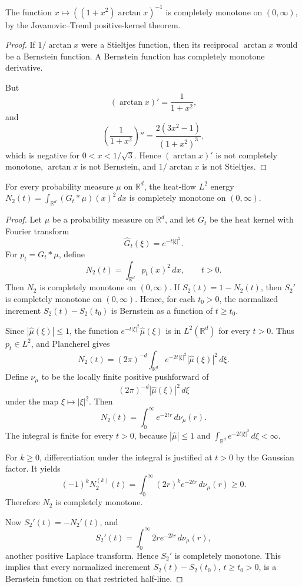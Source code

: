 \begin{lemma}
\label{res:jovanovic-treml-arctan-logderivative-cm}
The function \(x\mapsto ((1+x^2)\arctan x)^{-1}\) is completely monotone on \((0,\infty)\), by the Jovanovic--Treml positive-kernel theorem.
\end{lemma}
\begin{proof}
If \(1/\arctan x\) were a Stieltjes function, then its reciprocal \(\arctan x\) would be a Bernstein function. A Bernstein function has completely monotone derivative.

But
\[
(\arctan x)'=\frac1{1+x^2},
\]
and
\[
\left(\frac1{1+x^2}\right)''
=\frac{2(3x^2-1)}{(1+x^2)^3},
\]
which is negative for \(0<x<1/\sqrt3\). Hence \((\arctan x)'\) is not completely monotone, \(\arctan x\) is not Bernstein, and \(1/\arctan x\) is not Stieltjes.
\end{proof}

\begin{lemma}
\label{res:heat-flow-l2-energy-completely-monotone}
For every probability measure \(\mu\) on \(\mathbb R^d\), the heat-flow \(L^2\) energy \(N_2(t)=\int_{\mathbb R^d}(G_t*\mu)(x)^2\,dx\) is completely monotone on \((0,\infty)\).
\end{lemma}
\begin{proof}
Let \(\mu\) be a probability measure on \(\mathbb R^d\), and let \(G_t\) be the heat kernel with Fourier transform
\[
\widehat G_t(\xi)=e^{-t|\xi|^2}.
\]
For \(p_t=G_t*\mu\), define
\[
N_2(t)=\int_{\mathbb R^d}p_t(x)^2\,dx,\qquad t>0.
\]
Then \(N_2\) is completely monotone on \((0,\infty)\). If \(S_2(t)=1-N_2(t)\), then \(S_2'\) is completely monotone on \((0,\infty)\). Hence, for each \(t_0>0\), the normalized increment \(S_2(t)-S_2(t_0)\) is Bernstein as a function of \(t\ge t_0\).

Since \(|\widehat\mu(\xi)|\le1\), the function \(e^{-t|\xi|^2}\widehat\mu(\xi)\) is in \(L^2(\mathbb R^d)\) for every \(t>0\). Thus \(p_t\in L^2\), and Plancherel gives
\[
N_2(t)
=(2\pi)^{-d}\int_{\mathbb R^d}e^{-2t|\xi|^2}|\widehat\mu(\xi)|^2\,d\xi.
\]
Define \(\nu_\mu\) to be the locally finite positive pushforward of
\[
(2\pi)^{-d}|\widehat\mu(\xi)|^2\,d\xi
\]
under the map \(\xi\mapsto|\xi|^2\). Then
\[
N_2(t)=\int_0^\infty e^{-2tr}\,d\nu_\mu(r).
\]
The integral is finite for every \(t>0\), because \(|\widehat\mu|\le1\) and \(\int_{\mathbb R^d}e^{-2t|\xi|^2}\,d\xi<\infty\).

For \(k\ge0\), differentiation under the integral is justified at \(t>0\) by the Gaussian factor. It yields
\[
(-1)^kN_2^{(k)}(t)
=\int_0^\infty (2r)^k e^{-2tr}\,d\nu_\mu(r)\ge0.
\]
Therefore \(N_2\) is completely monotone.

Now \(S_2'(t)=-N_2'(t)\), and
\[
S_2'(t)=\int_0^\infty 2r e^{-2tr}\,d\nu_\mu(r),
\]
another positive Laplace transform. Hence \(S_2'\) is completely monotone. This implies that every normalized increment \(S_2(t)-S_2(t_0)\), \(t\ge t_0>0\), is a Bernstein function on that restricted half-line.
\end{proof}

